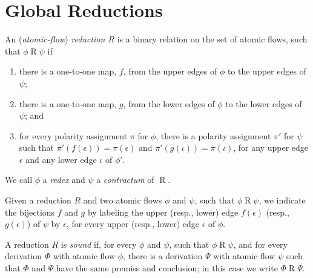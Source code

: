 \chapter{Global Reductions}


\begin{definition}\label{definition:FlowReduction}
An (\emph{atomic-flow}) \emph{reduction $R$} is a binary relation on the set of atomic flows, such that $\phi\mathrel{R}\psi$ if
\begin{enumerate}
\item
there is a one-to-one map, $f$, from the upper edges of $\phi$ to the upper edges of $\psi$;
\item
there is a one-to-one map, $g$, from the lower edges of $\phi$ to the lower edges of $\psi$; and
\item\label{definition:FlowReduction:item:Polarity}
for every polarity assignment $\pi$ for $\phi$, there is a polarity assignment $\pi'$ for $\psi$ such that $\pi'(f(\epsilon))=\pi(\epsilon)$ and $\pi'(g(\iota))=\pi(\iota)$, for any upper edge $\epsilon$ and any lower edge $\iota$ of $\phi'$.
\end{enumerate}
We call $\phi$ a \emph{redex} and $\psi$ a \emph{contractum} of $\mathrel R$.
\end{definition}

\begin{remark}\label{remark:LabelBijectionEdges}
Given a reduction $R$ and two atomic flows $\phi$ and $\psi$, such that $\phi\mathrel{R}\psi$, we indicate the bijections $f$ and $g$ by labeling the upper (resp., lower) edge $f(\epsilon)$ (resp., $g(\epsilon)$) of $\psi$ by $\epsilon$, for every upper (resp., lower) edge $\epsilon$ of $\phi$.
\end{remark}


\begin{definition}\label{definition:SoundRedcution}
A reduction $R$ is \emph{sound} if, for every $\phi$ and $\psi$, such that $\phi\mathrel{R}\psi$, and for every derivation $\Phi$ with atomic flow $\phi$, there is a derivation $\Psi$ with atomic flow $\psi$ such that $\Phi$ and $\Psi$ have the same premiss and conclusion; in this case we write $\Phi\mathrel{R}\Psi$.
\end{definition}

